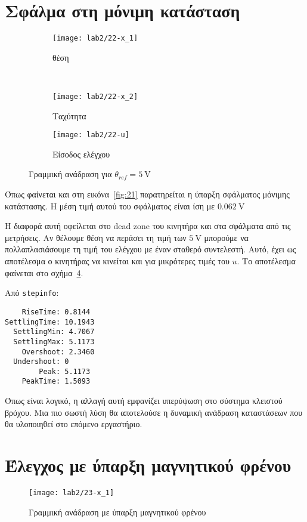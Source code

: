 \section{Σφάλμα στη μόνιμη κατάσταση}
\begin{figure}
  \centering
  \begin{subfigure}[t]{\linewidth}
    \texttt{[image: lab2/22-x\_1]}
    \caption{θέση}
    \label{fig:22-x_1}
  \end{subfigure}\\
  \begin{subfigure}[t]{0.45\linewidth}
    \texttt{[image: lab2/22-x\_2]}
    \caption{Ταχύτητα}
    \label{fig:22-x_2}
  \end{subfigure}\hfill
  \begin{subfigure}[t]{0.45\linewidth}
    \texttt{[image: lab2/22-u]}
    \caption{Είσοδος ελέγχου}
    \label{fig:22-u}
  \end{subfigure}
  \caption[Γραμμική ανάδραση με σταθερή τάση αναφοράς]{Γραμμική ανάδραση για $\theta_{ref} = \SI{5}{\volt}$}
  \label{fig:22}
\end{figure}

Όπως φαίνεται και στη εικόνα~\ref{fig:21} παρατηρείται η ύπαρξη σφάλματος μόνιμης κατάστασης.
Η μέση τιμή αυτού του σφάλματος είναι ίση με $\SI{0.062}{\volt}$

Η διαφορά αυτή οφείλεται στο dead zone του κινητήρα και στα σφάλματα από τις μετρήσεις.
Αν θέλουμε θέση να περάσει τη τιμή των $\SI{5}{\volt}$ μπορούμε να πολλαπλασιάσουμε τη τιμή του ελέγχου με έναν σταθερό συντελεστή.
Αυτό, έχει ως αποτέλεσμα ο κινητήρας να κινείται και για μικρότερες τιμές του $u$.
Το αποτέλεσμα φαίνεται στο σχήμα~\ref{fig:22}.

Από \texttt{stepinfo}:
\begin{code}
\begin{verbatim}
    RiseTime: 0.8144
SettlingTime: 10.1943
  SettlingMin: 4.7067
  SettlingMax: 5.1173
    Overshoot: 2.3460
  Undershoot: 0
        Peak: 5.1173
    PeakTime: 1.5093
\end{verbatim}
\end{code}
Όπως είναι λογικό, η αλλαγή αυτή εμφανίζει υπερύψωση στο σύστημα κλειστού βρόχου.
Μια πιο σωστή λύση θα αποτελούσε η δυναμική ανάδραση καταστάσεων που θα υλοποιηθεί στο επόμενο εργαστήριο.

\section{Έλεγχος με ύπαρξη μαγνητικού φρένου}
\begin{figure}[htb]
  \centering
  \texttt{[image: lab2/23-x\_1]}%
  \caption{Γραμμική ανάδραση με ύπαρξη μαγνητικού φρένου}
  \label{fig:23}
\end{figure}

